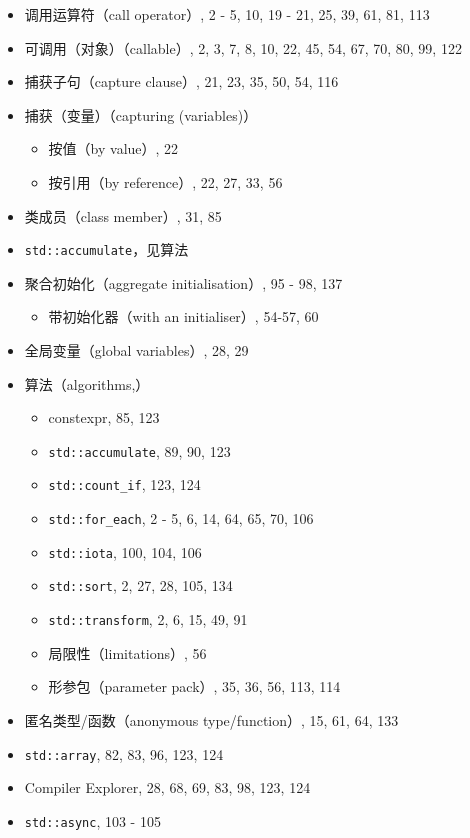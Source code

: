 \begin{itemize}
\item 调用运算符（call operator）, 2 - 5, 10, 19 - 21, 25, 39, 61, 81, 113
\item 可调用（对象）（callable）, 2, 3, 7, 8, 10, 22, 45, 54, 67, 70, 80, 99, 122
\item 捕获子句（capture clause）, 21, 23, 35, 50, 54, 116
\item 捕获（变量）（capturing (variables)）
  \begin{itemize}
  \item 按值（by value）, 22
  \item 按引用（by reference）, 22, 27, 33, 56
  \end{itemize}
\item 类成员（class member）, 31, 85
\item \texttt{std::accumulate}，见算法
\item 聚合初始化（aggregate initialisation）, 95 - 98, 137
  \begin{itemize}
  \item 带初始化器（with an initialiser）, 54-57, 60
  \end{itemize}
\item 全局变量（global variables）, 28, 29
\item 算法（algorithms,）
  \begin{itemize}
  \item constexpr, 85, 123
  \item \texttt{std::accumulate}, 89, 90, 123
  \item \texttt{std::count\_if}, 123, 124
  \item \texttt{std::for\_each}, 2 - 5, 6, 14, 64, 65, 70, 106
  \item \texttt{std::iota}, 100, 104, 106
  \item \texttt{std::sort}, 2, 27, 28, 105, 134
  \item \texttt{std::transform}, 2, 6, 15, 49, 91
  \item 局限性（limitations）, 56
  \item 形参包（parameter pack）, 35, 36, 56, 113, 114
  \end{itemize}
\item 匿名类型/函数（anonymous type/function）, 15, 61, 64, 133
\item \texttt{std::array}, 82, 83, 96, 123, 124
\item Compiler Explorer, 28, 68, 69, 83, 98, 123, 124
\item \texttt{std::async}, 103 - 105

\end{itemize}
